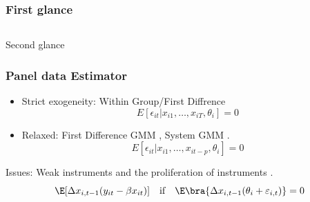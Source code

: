 \documentclass[10pt,mathserif,aspectratio=169]{beamer}
\begin{document}
\begin{frame}
  \frametitle{First glance}
  \begin{columns}[T,T]
    \makebox[\textwidth][c]{
      \fontsize{5pt}{5pt} \selectfont
      }

    \makebox[\textwidth][c]{
      \fontsize{5pt}{5pt} \selectfont
      }

  \end{columns}
\end{frame}

\begin{frame}[label=reg_sep]{Second glance}
  \begin{table}
    \fontsize{6pt}{6pt}\selectfont
    
  \end{table}
  \hyperlink{output}{}
\end{frame}

\begin{frame}
  \frametitle{Panel data Estimator}
  \begin{itemize}\itemsep=12pt
    \item Strict exogeneity: Within Group/First Diffrence
          \begin{equation*}
            E[\epsilon_{it}|x_{i1},\ldots, x_{iT},\theta_i]=0
          \end{equation*}
    \item Relaxed: First Difference GMM \citep{arellano1991some}, System GMM
          \citep{arellano1995another,blundell1998initial}.
          \begin{equation*}
            E[\epsilon_{it}|x_{i1},\ldots, x_{it-p},\theta_i]=0
          \end{equation*}
  \end{itemize}

  Issues: Weak instruments \citep{blundell1998initial} and the proliferation of
  instruments \citep{roodman2007short}.
  \begin{equation*}
    \E[\Delta x_{i,t-1}(y_{it}-\beta x_{it})] \quad \text{if}\quad \E\bra{\Delta x_{i,t-1}(\theta_i+\varepsilon_{i,t})}=0
  \end{equation*}
\end{frame}
\end{document}
